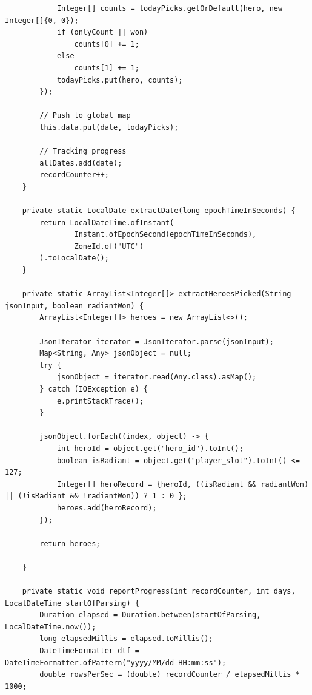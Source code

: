 \begin{verbatim}
            Integer[] counts = todayPicks.getOrDefault(hero, new Integer[]{0, 0});
            if (onlyCount || won)
                counts[0] += 1;
            else
                counts[1] += 1;
            todayPicks.put(hero, counts);
        });

        // Push to global map
        this.data.put(date, todayPicks);

        // Tracking progress
        allDates.add(date);
        recordCounter++;
    }

    private static LocalDate extractDate(long epochTimeInSeconds) {
        return LocalDateTime.ofInstant(
                Instant.ofEpochSecond(epochTimeInSeconds),
                ZoneId.of("UTC")
        ).toLocalDate();
    }

    private static ArrayList<Integer[]> extractHeroesPicked(String jsonInput, boolean radiantWon) {
        ArrayList<Integer[]> heroes = new ArrayList<>();

        JsonIterator iterator = JsonIterator.parse(jsonInput);
        Map<String, Any> jsonObject = null;
        try {
            jsonObject = iterator.read(Any.class).asMap();
        } catch (IOException e) {
            e.printStackTrace();
        }

        jsonObject.forEach((index, object) -> {
            int heroId = object.get("hero_id").toInt();
            boolean isRadiant = object.get("player_slot").toInt() <= 127;
            Integer[] heroRecord = {heroId, ((isRadiant && radiantWon) || (!isRadiant && !radiantWon)) ? 1 : 0 };
            heroes.add(heroRecord);
        });

        return heroes;

    }

    private static void reportProgress(int recordCounter, int days, LocalDateTime startOfParsing) {
        Duration elapsed = Duration.between(startOfParsing, LocalDateTime.now());
        long elapsedMillis = elapsed.toMillis();
        DateTimeFormatter dtf = DateTimeFormatter.ofPattern("yyyy/MM/dd HH:mm:ss");
        double rowsPerSec = (double) recordCounter / elapsedMillis * 1000;


\end{verbatim}
